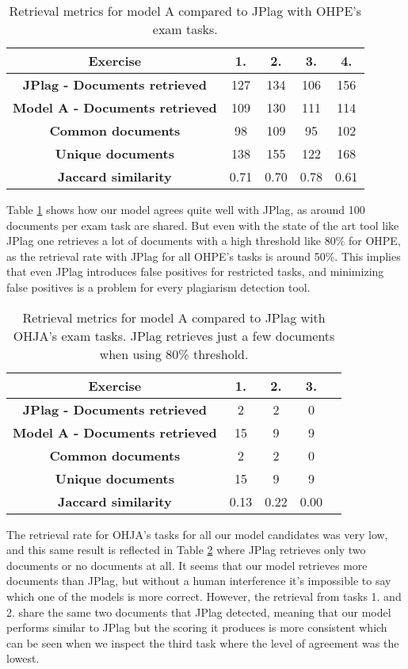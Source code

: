 \begin{table}[ht]
\centering
\caption{Retrieval metrics for model A compared to JPlag with OHPE's exam tasks.}
\begin{tabular}{|c||c|c|c|c|}
\hline
\bf Exercise & 1. & 2. & 3. & 4. \\ \hline
\bf JPlag - Documents retrieved & 127 & 134 & 106 & 156 \\ \hline
\bf Model A - Documents retrieved & 109 & 130 & 111 & 114\\ \hline
\bf Common documents & 98  & 109 & 95 & 102\\ \hline
\bf Unique documents & 138 & 155 & 122 & 168\\ \hline
\bf Jaccard similarity    & 0.71  & 0.70  & 0.78  & 0.61  \\ \hline
\end{tabular}
\label{tbl-jacc-sd-ohpe}
\end{table}

\noindent
Table \ref{tbl-jacc-sd-ohpe} shows how our model agrees quite well with JPlag, as around 100 documents per exam task are shared. But even with the state of the art tool like JPlag one retrieves a lot of documents with a high threshold like 80\% for OHPE, as the retrieval rate with JPlag for all OHPE's tasks is around 50\%. This implies that even JPlag introduces false positives for restricted tasks, and minimizing false positives is a problem for every plagiarism detection tool.   

\begin{table}[ht]
\centering
\caption{Retrieval metrics for model A compared to JPlag with OHJA's exam tasks. JPlag retrieves just a few documents when using 80\% threshold.}
\begin{tabular}{|c||c|c|c|c|}
\hline
\bf Exercise & 1. & 2. & 3. \\ \hline
\bf JPlag - Documents retrieved & 2 & 2 & 0  \\ \hline
\bf Model A - Documents retrieved & 15 & 9 & 9 \\ \hline
\bf Common documents & 2  & 2 & 0\\ \hline
\bf Unique documents & 15 & 9 & 9\\ \hline
\bf Jaccard similarity    & 0.13  & 0.22  & 0.00  \\ \hline
\end{tabular}
\label{tbl-jacc-sd-ohja}
\end{table}

\noindent
The retrieval rate for OHJA's tasks for all our model candidates was very low, and this same result is reflected in Table \ref{tbl-jacc-sd-ohja} where JPlag retrieves only two documents or no documents at all. It seems that our model retrieves more documents than JPlag, but without a human interference it's impossible to say which one of the models is more correct. However, the retrieval from tasks 1. and 2. share the same two documents that JPlag detected, meaning that our model performs similar to JPlag but the scoring it produces is more consistent which can be seen when we inspect the third task where the level of agreement was the lowest. 


